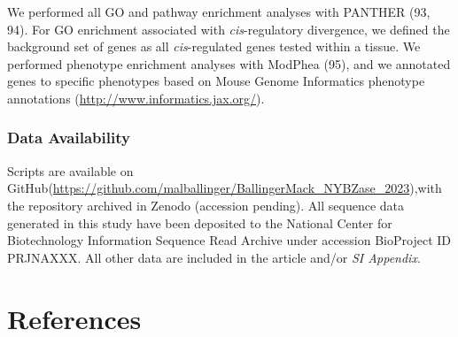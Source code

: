 \documentclass[9pt,twocolumn,twoside,lineno]{pnas-new}
\begin{document}
We performed all GO and pathway enrichment analyses with PANTHER (93,
94). For GO enrichment associated with \emph{cis}-regulatory divergence,
we defined the background set of genes as all \emph{cis}-regulated genes
tested within a tissue. We performed phenotype enrichment analyses with
ModPhea (95), and we annotated genes to specific phenotypes based on
Mouse Genome Informatics phenotype annotations
(\url{http://www.informatics.jax.org/}).

\hypertarget{data-availability}{%
\subsubsection*{Data Availability}\label{data-availability}}

Scripts are available on
GitHub(\url{https://github.com/malballinger/BallingerMack_NYBZase_2023}),with
the repository archived in Zenodo (accession pending). All sequence data
generated in this study have been deposited to the National Center for
Biotechnology Information Sequence Read Archive under accession
BioProject ID PRJNAXXX. All other data are included in the article
and/or \emph{SI Appendix}.

\showmatmethods
\showacknow
\pnasbreak

\hypertarget{references}{%
\section*{References}\label{references}}
\end{document}
